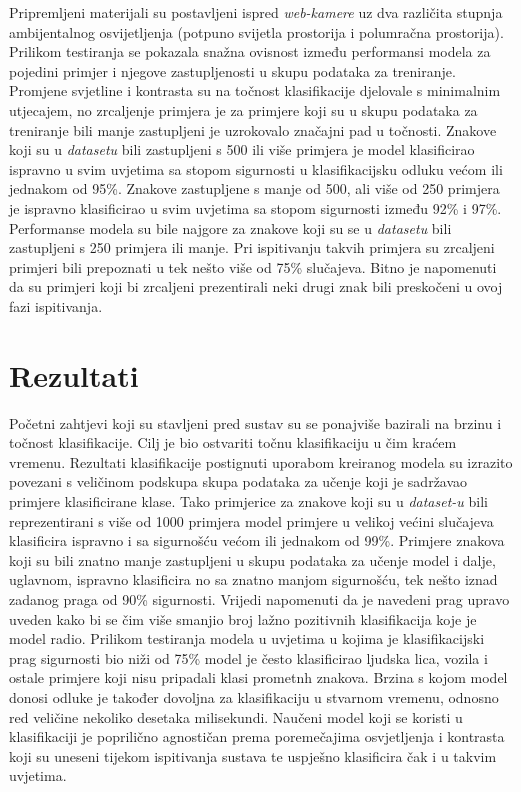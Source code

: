 \documentclass[times, utf8, zavrsni]{fer}
\begin{document}
Pripremljeni materijali su postavljeni ispred \emph{web-kamere} uz dva različita stupnja ambijentalnog osvijetljenja (potpuno svijetla prostorija i polumračna prostorija). Prilikom testiranja se pokazala snažna ovisnost između performansi modela za pojedini primjer i njegove zastupljenosti u skupu podataka za treniranje.
Promjene svjetline i kontrasta su na točnost klasifikacije djelovale s minimalnim utjecajem, no zrcaljenje primjera je za primjere koji su u skupu podataka za treniranje bili manje zastupljeni je uzrokovalo značajni pad u točnosti. Znakove koji su u \emph{datasetu} bili zastupljeni s 500 ili više primjera
je model klasificirao ispravno u svim uvjetima sa stopom sigurnosti u klasifikacijsku odluku većom ili jednakom od 95\%. Znakove zastupljene s manje od 500, ali više od 250 primjera je ispravno klasificirao u svim uvjetima sa stopom sigurnosti između 92\% i 97\%. Performanse modela su bile najgore za znakove koji su se u \emph{datasetu}
bili zastupljeni s 250 primjera ili manje. Pri ispitivanju takvih primjera su zrcaljeni primjeri bili prepoznati u tek nešto više od 75\% slučajeva. Bitno je napomenuti da su primjeri koji bi zrcaljeni prezentirali neki drugi znak bili preskočeni u ovoj fazi ispitivanja.

\chapter{Rezultati}
Početni zahtjevi koji su stavljeni pred sustav su se ponajviše bazirali na brzinu i točnost klasifikacije. Cilj je bio ostvariti točnu klasifikaciju u čim kraćem vremenu.
Rezultati klasifikacije postignuti uporabom kreiranog modela su izrazito povezani s veličinom podskupa skupa podataka za učenje koji je sadržavao primjere klasificirane klase. Tako primjerice za znakove koji su u \emph{dataset-u} bili reprezentirani s više od 1000 primjera model primjere 
u velikoj većini slučajeva klasificira ispravno i sa sigurnošću većom ili jednakom od 99\%. Primjere znakova koji su bili znatno manje zastupljeni u skupu podataka za učenje model i dalje, uglavnom, ispravno klasificira no sa znatno manjom sigurnošću, tek nešto iznad zadanog praga od 90\% sigurnosti.
Vrijedi napomenuti da je navedeni prag upravo uveden kako bi se čim više smanjio broj lažno pozitivnih klasifikacija koje je model radio. Prilikom testiranja modela u uvjetima u kojima je klasifikacijski prag sigurnosti bio niži od 75\% model je često klasificirao ljudska lica, vozila i ostale
primjere koji nisu pripadali klasi prometnh znakova. Brzina s kojom model donosi odluke je također dovoljna za klasifikaciju u stvarnom vremenu, odnosno red veličine nekoliko desetaka milisekundi.
Naučeni model koji se koristi u klasifikaciji je poprilično agnostičan prema poremečajima osvjetljenja i kontrasta koji su uneseni tijekom ispitivanja sustava te uspješno klasificira čak i u takvim uvjetima.
\end{document}
